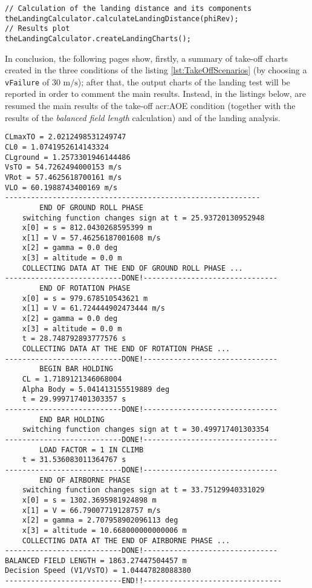 \bigskip
\begin{lstlisting}[caption={Landing calculations and charts plot}, captionpos=b, tabsize=2]
// Calculation of the landing distance and its components
theLandingCalculator.calculateLandingDistance(phiRev);
// Results plot
theLandingCalculator.createLandingCharts();
\end{lstlisting}
%
In conclusion, the following pages show, firstly, a summary of take-off charts created in the three conditions of the listing \ref{lst:TakeOffScenarios} (by choosing a \lstinline[language=Java]!vFailure! of 30 $\si{\meter\per\second}$); after that, the output charts of the landing test will be reported in order to comment the main results. Instead, in the listings below, are resumed the main results of the take-off \gls{acr:AOE} condition (together with the results of the \emph{balanced field length} calculation) and of the landing analysis.

\bigskip
\begin{lstlisting}[caption={ATR-72 take-off test results}, captionpos=b, tabsize=2]
CLmaxTO = 2.0212498531249747
CL0 = 1.0741952614143324
CLground = 1.2573301946144486
VsTO = 54.7262494000153 m/s
VRot = 57.4625618700161 m/s
VLO = 60.1988743400169 m/s
-----------------------------------------------------------
		END OF GROUND ROLL PHASE
	switching function changes sign at t = 25.93720130952948
	x[0] = s = 812.0430268595399 m
	x[1] = V = 57.46256187001608 m/s
	x[2] = gamma = 0.0 deg
	x[3] = altitude = 0.0 m
	COLLECTING DATA AT THE END OF GROUND ROLL PHASE ...
---------------------------DONE!-------------------------------
		END OF ROTATION PHASE
	x[0] = s = 979.678510543621 m
	x[1] = V = 61.724444902473444 m/s
	x[2] = gamma = 0.0 deg
	x[3] = altitude = 0.0 m
	t = 28.748792893777576 s
	COLLECTING DATA AT THE END OF ROTATION PHASE ...
---------------------------DONE!-------------------------------
		BEGIN BAR HOLDING
	CL = 1.7189121346068004
	Alpha Body = 5.041413155519889 deg
	t = 29.999717401303357 s
---------------------------DONE!-------------------------------
		END BAR HOLDING
	switching function changes sign at t = 30.499717401303354
---------------------------DONE!-------------------------------
		LOAD FACTOR = 1 IN CLIMB
	t = 31.536083011364767 s
---------------------------DONE!-------------------------------
		END OF AIRBORNE PHASE
	switching function changes sign at t = 33.75129940331029
	x[0] = s = 1302.3695981924898 m
	x[1] = V = 66.79007719128757 m/s
	x[2] = gamma = 2.707958902096113 deg
	x[3] = altitude = 10.668000000000006 m
	COLLECTING DATA AT THE END OF AIRBORNE PHASE ...
---------------------------DONE!-------------------------------
BALANCED FIELD LENGTH = 1863.27447504457 m
Decision Speed (V1/VsTO) = 1.04447828088380 
---------------------------END!!--------------------------------
\end{lstlisting}

